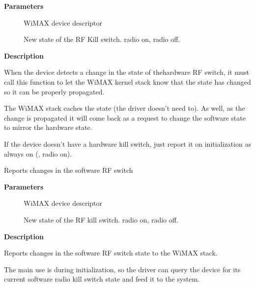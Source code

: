 \documentclass[a4paper,8pt,english]{sphinxmanual}
\begin{document}
\textbf{Parameters}
\begin{description}
\item[{}] \leavevmode
WiMAX device descriptor

\item[{}] \leavevmode
New state of the RF Kill switch.  radio on,
 radio off.

\end{description}

\textbf{Description}

When the device detects a change in the state of thehardware RF
switch, it must call this function to let the WiMAX kernel stack
know that the state has changed so it can be properly propagated.

The WiMAX stack caches the state (the driver doesn't need to). As
well, as the change is propagated it will come back as a request to
change the software state to mirror the hardware state.

If the device doesn't have a hardware kill switch, just report
it on initialization as always on (, radio on).

\begin{fulllineitems}
\label{networking/kapi:c.wimax_report_rfkill_sw}
Reports changes in the software RF switch

\end{fulllineitems}


\textbf{Parameters}
\begin{description}
\item[{}] \leavevmode
WiMAX device descriptor

\item[{}] \leavevmode
New state of the RF kill switch.  radio on,
 radio off.

\end{description}

\textbf{Description}

Reports changes in the software RF switch state to the WiMAX stack.

The main use is during initialization, so the driver can query the
device for its current software radio kill switch state and feed it
to the system.
\end{document}
